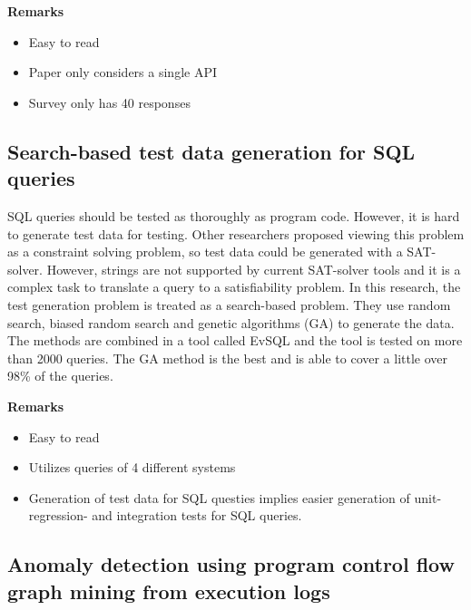 \documentclass[]{book}
\providecommand{\tightlist}{%
  \setlength{\itemsep}{0pt}\setlength{\parskip}{0pt}}
\begin{document}
\textbf{Remarks}

\begin{itemize}
\tightlist
\item
  Easy to read
\item
  Paper only considers a single API
\item
  Survey only has 40 responses
\end{itemize}

\subsection{Search-based test data generation for SQL
queries}\label{search-based-test-data-generation-for-sql-queries}

SQL queries should be tested as thoroughly as program code. However, it
is hard to generate test data for testing. Other researchers proposed
viewing this problem as a constraint solving problem, so test data could
be generated with a SAT-solver. However, strings are not supported by
current SAT-solver tools and it is a complex task to translate a query
to a satisfiability problem. In this research, the test generation
problem is treated as a search-based problem. They use random search,
biased random search and genetic algorithms (GA) to generate the data.
The methods are combined in a tool called EvSQL and the tool is tested
on more than 2000 queries. The GA method is the best and is able to
cover a little over 98\% of the queries.

\textbf{Remarks}

\begin{itemize}
\tightlist
\item
  Easy to read
\item
  Utilizes queries of 4 different systems
\item
  Generation of test data for SQL questies implies easier generation of
  unit- regression- and integration tests for SQL queries.
\end{itemize}

\subsection{Anomaly detection using program control flow graph mining
from execution
logs}\label{anomaly-detection-using-program-control-flow-graph-mining-from-execution-logs}
\end{document}
